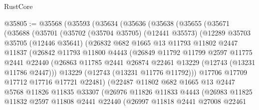 \begin{lexlean}{RustCore}
\begin{coremodule}
@35805 := @35568
    (@35593
      (@35634
        (@35636
          (@35638
            (@35655
              (@35671
                (@35688
                  (@35701
                    (@35702
                      (@35704 @35705)
                      (@12441 @35573)
                      (@12289
                        @35703
                        @35705
                        (@12446 @35641)
                        (@26832
                          @682
                          @1665
                          @13
                          @11793
                          @11802
                          @2447
                          @11837
                          (@26842
                            @11793
                            @11800
                            @4443
                            (@26849
                              @11792
                              @11799
                              @2597
                              @11775
                              @2441
                              @22440
                              (@26863
                                @11785
                                @2441
                                @26874
                                @22461
                                @13229
                                (@12743 (@13231 @11786 @2447)))
                              @13229
                              (@12743 (@13231 @11776 @11792)))
                            @17706
                            @17709
                            @17712
                            @17716
                            @17721
                            @22481)
                          (@22487
                            @11802
                            @682
                            @1665
                            @13
                            @2447
                            @5768
                            @11826
                            @11835
                            @33307
                            (@26976
                              @11826
                              @11833
                              @4443
                              (@26983
                                @11825
                                @11832
                                @2597
                                @11808
                                @2441
                                @22440
                                (@26997
                                  @11818
                                  @2441
                                  @27008
                                  @22461

\end{coremodule}
\end{lexlean}
